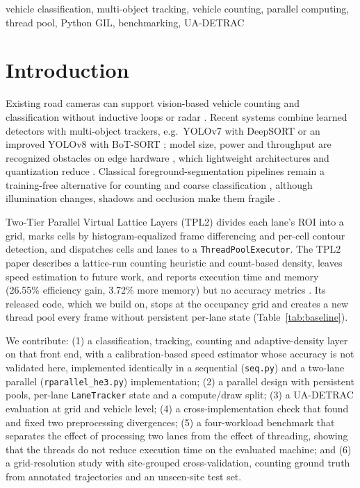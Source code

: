\documentclass[conference]{IEEEtran}
\newcommand{\code}[1]{\texttt{#1}}
\begin{document}
\begin{IEEEkeywords}
vehicle classification, multi-object tracking, vehicle counting,
parallel computing, thread pool, Python GIL, benchmarking, UA-DETRAC
\end{IEEEkeywords}

\section{Introduction}
\label{sec:intro}
Existing road cameras can support vision-based vehicle counting and
classification without inductive loops or radar \cite{crouzil2016}.
Recent systems combine learned detectors with multi-object trackers,
e.g.\ YOLOv7 with DeepSORT \cite{lian2025} or an improved YOLOv8 with
BoT-SORT \cite{liu2025}; model size, power and throughput are recognized
obstacles on edge hardware \cite{zhai2023}, which lightweight
architectures and quantization reduce \cite{chang2025,macko2025}.
Classical foreground-segmentation pipelines remain a training-free
alternative for counting and coarse classification \cite{unzueta2012},
although illumination changes, shadows and occlusion make them fragile
\cite{abbas2021,chen2020}.

Two-Tier Parallel Virtual Lattice Layers (TPL2) \cite{baseline} divides
each lane's ROI into a grid, marks cells by histogram-equalized frame
differencing and per-cell contour detection, and dispatches cells and
lanes to a \code{ThreadPoolExecutor}. The TPL2 paper describes a
lattice-run counting heuristic and count-based density, leaves speed
estimation to future work, and reports execution time and memory
(26.55\% efficiency gain, 3.72\% more memory) but no accuracy metrics
\cite{baseline,muthuraja2026}. Its released code, which we build on,
stops at the occupancy grid and creates a new thread pool every frame
without persistent per-lane state (Table~\ref{tab:baseline}).

We contribute: (1) a classification, tracking, counting and
adaptive-density layer on that front end, with a calibration-based speed
estimator whose accuracy is not validated here, implemented identically in
a sequential (\code{seq.py}) and a two-lane parallel
(\code{rparallel\_he3.py}) implementation; (2) a parallel design with
persistent pools, per-lane \code{LaneTracker} state and a compute/draw
split; (3) a UA-DETRAC evaluation at grid and vehicle level;
(4) a cross-implementation check that found and fixed two preprocessing
divergences; (5) a four-workload benchmark that separates the effect
of processing two lanes from the effect of threading, showing that the
threads do not reduce execution time on the evaluated machine; and (6) a
grid-resolution study with site-grouped cross-validation, counting ground
truth from annotated trajectories and an unseen-site test set.
\end{document}
